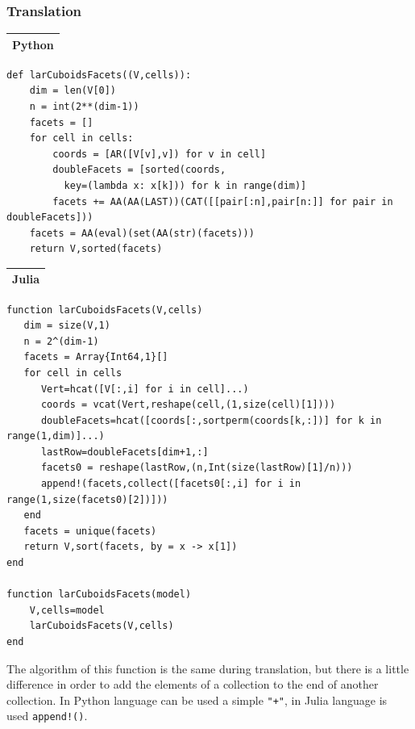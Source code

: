 \documentclass{article}
\begin{document}
\begin{flushleft} \small
\subsubsection{Translation}
\vspace{1ex}
\begin{center}
\begin{tabular}{|p{16cm}|}
\hline
\cellcolor[gray]{.9}Python\\
\hline
\end{tabular}
\end{center}
\vspace{2ex}
\begin{list}{}{} \item
\begin{Verbatim}[tabsize=3]
def larCuboidsFacets((V,cells)):
	dim = len(V[0])
	n = int(2**(dim-1))
	facets = []
	for cell in cells:
		coords = [AR([V[v],v]) for v in cell] 
		doubleFacets = [sorted(coords,
		  key=(lambda x: x[k])) for k in range(dim)] 
		facets += AA(AA(LAST))(CAT([[pair[:n],pair[n:]] for pair in doubleFacets]))
	facets = AA(eval)(set(AA(str)(facets))) 
	return V,sorted(facets)
\end{Verbatim}
\end{list}
\vspace{2ex}
\begin{center}
\begin{tabular}{|p{16cm}|}
\hline
\cellcolor[gray]{.9}Julia\\
\hline
\end{tabular}
\end{center}
\vspace{2ex}
\begin{list}{}{} \item
\begin{Verbatim}[tabsize=3]
function larCuboidsFacets(V,cells)
   dim = size(V,1)
   n = 2^(dim-1)
   facets = Array{Int64,1}[]
   for cell in cells
      Vert=hcat([V[:,i] for i in cell]...)
      coords = vcat(Vert,reshape(cell,(1,size(cell)[1])))
      doubleFacets=hcat([coords[:,sortperm(coords[k,:])] for k in range(1,dim)]...)
      lastRow=doubleFacets[dim+1,:]
      facets0 = reshape(lastRow,(n,Int(size(lastRow)[1]/n)))
      append!(facets,collect([facets0[:,i] for i in range(1,size(facets0)[2])]))
   end
   facets = unique(facets)
   return V,sort(facets, by = x -> x[1])
end

function larCuboidsFacets(model)
    V,cells=model
    larCuboidsFacets(V,cells)
end
  \end{Verbatim}
\end{list}

\end{flushleft}
\vspace{2ex}
The algorithm of this function is the same during translation, but there is a little difference in order to add the elements of a collection to the end of another collection. In Python language can be used a simple \texttt{"+"}, in Julia language is used \texttt{append!()}. 
\end{document}
